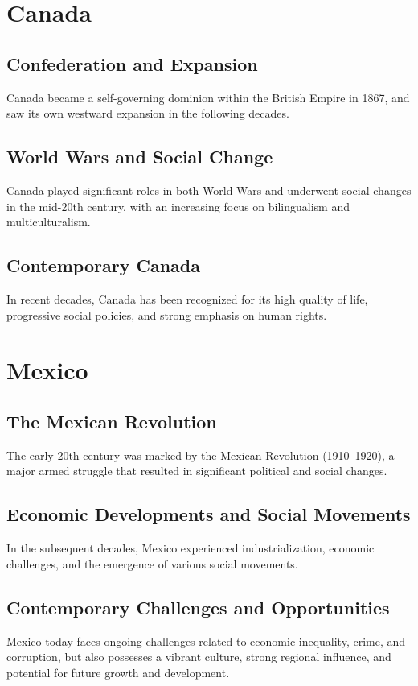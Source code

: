 \documentclass[a4paper,12pt]{book}
\begin{document}
\section{Canada}
\label{sec:canada}

\subsection{Confederation and Expansion}
Canada became a self-governing dominion within the British Empire in 1867, and saw its own westward expansion in the following decades.

\subsection{World Wars and Social Change}
Canada played significant roles in both World Wars and underwent social changes in the mid-20th century, with an increasing focus on bilingualism and multiculturalism.

\subsection{Contemporary Canada}
In recent decades, Canada has been recognized for its high quality of life, progressive social policies, and strong emphasis on human rights.

\section{Mexico}
\label{sec:mexico}

\subsection{The Mexican Revolution}
The early 20th century was marked by the Mexican Revolution (1910–1920), a major armed struggle that resulted in significant political and social changes.

\subsection{Economic Developments and Social Movements}
In the subsequent decades, Mexico experienced industrialization, economic challenges, and the emergence of various social movements.

\subsection{Contemporary Challenges and Opportunities}
Mexico today faces ongoing challenges related to economic inequality, crime, and corruption, but also possesses a vibrant culture, strong regional influence, and potential for future growth and development.
\end{document}

